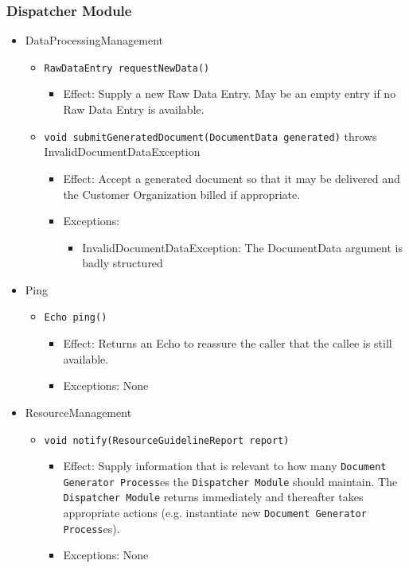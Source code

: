 \documentclass[a4paper,10pt]{article}
\begin{document}
\subsubsection*{Dispatcher Module}
\begin{itemize}
    \item DataProcessingManagement
    \begin{itemize}
        \item \texttt{RawDataEntry requestNewData()}
        \begin{itemize}
            \item Effect: Supply a new Raw Data Entry. May be an empty entry if no Raw Data Entry is available.
        \end{itemize}
        
        \item \texttt{void submitGeneratedDocument(DocumentData generated)} throws InvalidDocumentDataException
        \begin{itemize}
            \item Effect: Accept a generated document so that it may be delivered and the Customer Organization billed if appropriate.
            \item Exceptions:
            \begin{itemize}
            	\item InvalidDocumentDataException: The DocumentData argument is badly structured
            \end{itemize}
        \end{itemize}
    \end{itemize}
	\item Ping
	\begin{itemize}
		\item \texttt{Echo ping()}
		\begin{itemize}
			\item Effect: Returns an Echo to reassure the caller that the callee is still available. 
			\item Exceptions: None
		\end{itemize}
	\end{itemize}
\end{itemize}

\begin{itemize}
	\item ResourceManagement
	\begin{itemize}
		\item \texttt{void notify(ResourceGuidelineReport report)}
		\begin{itemize}
			\item Effect: Supply information that is relevant to how many \texttt{Document Generator Process}es the \texttt{Dispatcher Module} should maintain. The \texttt{Dispatcher Module} returns immediately and thereafter takes appropriate actions (e.g. instantiate new \texttt{Document Generator Process}es).
			\item Exceptions: None
		\end{itemize}
	\end{itemize}
\end{itemize}
\end{document}
